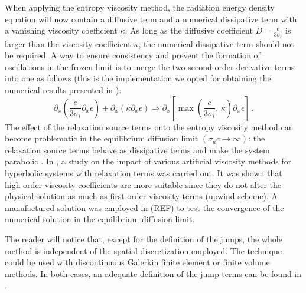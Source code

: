 \documentclass[review]{elsarticle}
\begin{document}
When applying the entropy viscosity method, the radiation energy density equation will now contain a diffusive term and a numerical dissipative term with a vanishing viscosity coefficient $\kappa$. As long as the diffusive coefficient $D=\frac{c}{3 \sigma_t}$ is larger than the viscosity coefficient $\kappa$, the numerical dissipative term should not be required. A way to ensure consistency and prevent the formation of oscillations in the frozen limit is to merge the two second-order derivative terms into one as follows (this is the implementation we opted for obtaining the numerical results presented in ):
\begin{equation}
 \partial_x \left( \frac{c}{3 \sigma_t} \partial_x \epsilon \right) + \partial_x \left( \kappa \partial_x \epsilon \right) 
 \Longrightarrow
 \partial_x \left[ \max\left(\frac{c}{3 \sigma_t} \text{, } \kappa \right) \partial_x \epsilon \right] \,.
\end{equation}
The effect of the relaxation source terms onto the entropy viscosity method can become problematic in the equilibrium diffusion limit $(\sigma_a c \to \infty)$: the relaxation source terms behave as dissipative terms and make the system parabolic \cite{Leveque}. In \cite{ShiJin}, a study on the impact of various artificial viscosity methods for hyperbolic systems with relaxation terms was carried out. It was shown that high-order viscosity coefficients are more suitable since they do not alter the physical solution as much as first-order viscosity terms (upwind scheme). A manufactured  solution was employed in (REF) to test the convergence of the numerical solution in the equilibrium-diffusion limit.  
%
 \begin{remark}
The reader will notice that, except for the definition of the jumps, the whole method is independent of the spatial discretization employed. The technique could be used with discontinuous Galerkin finite element or finite volume methods. In both cases, an adequate  definition of the jump terms can be found in \cite{valentin}.
 \end{remark}
%
\end{document}
